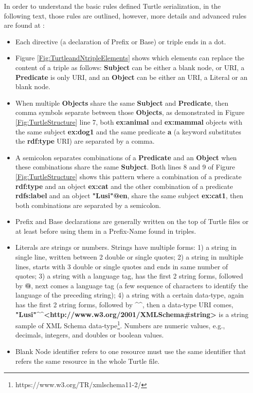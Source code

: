 In order to understand the basic rules defined Turtle serialization, in the following text, those rules are outlined, however, more details and advanced rules are found at \cite{W3C:Turtle:Online}:
\begin{itemize}
    \item Each directive (a declaration of Prefix or Base) or triple ends  in a  dot.
    \item Figure \ref{Fig:TurtleandNtripleElements} shows which elements can replace the content of a triple as follows: \textbf{Subject} can be either a blank node, or URI, a \textbf{Predicate} is only URI, and an \textbf{Object} can be either an URI, a Literal or an blank node.
    \item When multiple \textbf{Objects} share the same \textbf{Subject} and \textbf{Predicate}, then comma symbols separate between those \textbf{Objects}, as demonstrated in Figure \ref{Fig:TurtleStructure} line 7, both \textbf{ex:animal} and \textbf{ex:mammal} objects with the same subject \textbf{ex:dog1} and the same predicate \textbf{a}  (a keyword substitutes the \textbf{rdf:type} URI) are separated by a comma.
     \item A semicolon separates combinations of a \textbf{Predicate} and an \textbf{Object} when these combinations share the same \textbf{Subject}. Both lines 8 and 9 of Figure \ref{Fig:TurtleStructure} shows this pattern where a combination of a predicate \textbf{rdf:type} and an object \textbf{ex:cat} and the other combination of a predicate \textbf{rdfs:label} and an object \textbf{"Lusi"@en}, share the same subject \textbf{ex:cat1}, then both combinations are separated by a semicolon.
      \item Prefix and Base declarations are generally written on the top of Turtle files or at least before using them in a Prefix-Name found in triples.
     \item Literals are strings or numbers. Strings have multiple forms: 1) a string in single line, written between 2 double or single quotes; 2) a string in multiple lines, starts with 3 double or single  quotes and ends in same number of quotes; 3) a string with a language tag, has the first 2 string forms, followed by \textbf{@}, next comes a language tag (a few sequence of characters to identify the language of the preceding string); 4) a string with a certain data-type, again has the first 2 string forms, followed by \textbf{\textasciicircum\textasciicircum}, then a data-type URI comes, \textbf{"Lusi"\textasciicircum\textasciicircum\textless http://www.w3.org/2001/XMLSchema\#string\textgreater} is a string sample of XML Schema data-type\footnote{https://www.w3.org/TR/xmlschema11-2/}. Numbers are numeric values, e.g., decimals, integers, and doubles or boolean values.
     \item Blank Node identifier refers to one resource must use the same identifier that refers the same resource in the whole Turtle file.   
     
     
\end{itemize} 

